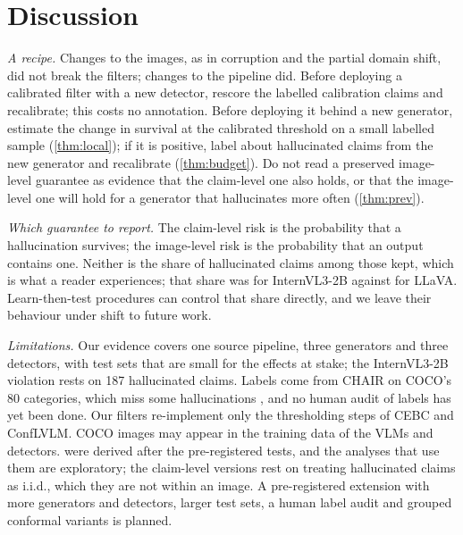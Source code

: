 \documentclass[journal]{IEEEtran}
\theoremstyle{remark}\newtheorem{remark}{Remark}
\begin{document}
\section{Discussion}\label{sec:discussion}
\emph{A recipe.} Changes to the images, as in corruption and the partial domain shift, did not break the filters; changes to the pipeline did. Before deploying a calibrated filter with a new detector, rescore the labelled calibration claims and recalibrate; this costs no annotation. Before deploying it behind a new generator, estimate the change in survival at the calibrated threshold on a small labelled sample (\cref{thm:local}); if it is positive, label about \BudgetTen{} hallucinated claims from the new generator and recalibrate (\cref{thm:budget}). Do not read a preserved image-level guarantee as evidence that the claim-level one also holds, or that the image-level one will hold for a generator that hallucinates more often (\cref{thm:prev}).

\emph{Which guarantee to report.} The claim-level risk is the probability that a hallucination survives; the image-level risk is the probability that an output contains one. Neither is the share of hallucinated claims among those kept, which is what a reader experiences; that share was \InternKeptHall{} for InternVL3-2B against \CleanKeptHall{} for LLaVA. Learn-then-test procedures can control that share directly, and we leave their behaviour under shift to future work.

\emph{Limitations.}\label{sec:limits} Our evidence covers one source pipeline, three generators and three detectors, with test sets that are small for the effects at stake; the InternVL3-2B violation rests on 187 hallucinated claims. Labels come from CHAIR on COCO's 80 categories, which miss some hallucinations \cite{petryk2024aloha}, and no human audit of labels has yet been done. Our filters re-implement only the thresholding steps of CEBC and ConfLVLM. COCO images may appear in the training data of the VLMs and detectors.  were derived after the pre-registered tests, and the analyses that use them are exploratory; the claim-level versions rest on treating hallucinated claims as i.i.d., which they are not within an image. A pre-registered extension with more generators and detectors, larger test sets, a human label audit and grouped conformal variants is planned.

\end{document}
